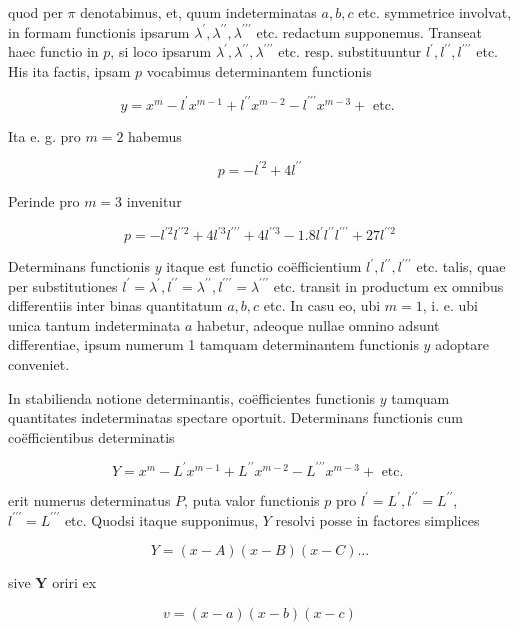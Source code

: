 \documentclass[twoside,12pt, showframe]{memoir}
\begin{document}
quod per \(\pi\) denotabimus, et, quum indeterminatas \(a, b, c\) etc. symmetrice involvat, in formam functionis ipsarum \(\lambda^{\prime}, \lambda^{\prime \prime}, \lambda^{\prime \prime \prime}\) etc. redactum supponemus. Transeat haec functio in \(p\), si loco ipsarum \(\lambda^{\prime}, \lambda^{\prime \prime}, \lambda^{\prime \prime \prime}\) etc. resp. substituuntur \(l^{\prime}, l^{\prime \prime}, l^{\prime \prime \prime}\) etc. His ita factis, ipsam \(p\) vocabimus determinantem functionis

\[
y=x^{m}-l^{\prime} x^{m-1}+l^{\prime \prime} x^{m-2}-l^{\prime \prime \prime} x^{m-3}+\text { etc. }
\]

Ita e. g. pro \(m=2\) habemus

\[
p=-l^{\prime 2}+4 l^{\prime \prime}
\]

Perinde pro \(m=3\) invenitur

\[
p=-l^{\prime 2} l^{\prime \prime 2}+4 l^{\prime 3} l^{\prime \prime \prime}+4 l^{\prime \prime 3}-1.8 l^{\prime} l^{\prime \prime} l^{\prime \prime \prime}+27 l^{\prime \prime 2}
\]

Determinans functionis \(y\) itaque est functio coëfficientium \(l^{\prime}, l^{\prime \prime}, l^{\prime \prime \prime}\) etc. talis, quae per substitutiones \(l^{\prime}=\lambda^{\prime}, l^{\prime \prime}=\lambda^{\prime \prime}, l^{\prime \prime \prime}=\lambda^{\prime \prime \prime}\) etc. transit in productum ex omnibus differentiis inter binas quantitatum \(a, b, c\) etc. In casu eo, ubi \(m=1\), i. e. ubi unica tantum indeterminata \(a\) habetur, adeoque nullae omnino adsunt differentiae, ipsum numerum 1 tamquam determinantem functionis \(y\) adoptare conveniet.

In stabilienda notione determinantis, coëfficientes functionis \(y\) tamquam quantitates indeterminatas spectare oportuit. Determinans functionis cum coëfficientibus determinatis

\[
Y=x^{m}-L^{\prime} x^{m-1}+L^{\prime \prime} x^{m-2}-L^{\prime \prime \prime} x^{m-3}+\text { etc. }
\]

erit numerus determinatus \(P\), puta valor functionis \(p\) pro \(l^{\prime}=L^{\prime}, l^{\prime \prime}=L^{\prime \prime}\), \(l^{\prime \prime \prime}=L^{\prime \prime \prime}\) etc. Quodsi itaque supponimus, \(Y\) resolvi posse in factores simplices

\[
Y=(x-A)(x-B)(x-C) \ldots
\]

sive \(\boldsymbol{Y}\) oriri ex

\[
v=(x-a)(x-b)(x-c)
\]
\end{document}
